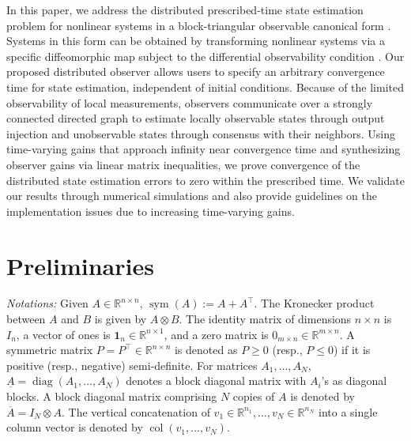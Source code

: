 \documentclass[journal]{IEEEtran}
\newcommand{\diag}{\operatorname{diag}}	%
\newcommand{\sym}{\operatorname{sym}}
\newcommand{\col}{\operatorname{col}}
\def\T{\top}
\begin{document}
In this paper, we address the distributed prescribed-time state estimation problem for nonlinear systems in a block-triangular observable canonical form \cite{Gauthier2001, Shim2001, Hammouri2010}.
Systems in this form can be obtained by transforming nonlinear systems via a specific diffeomorphic map subject to the differential observability condition \cite{Shim2001, gauthier1992}.
Our proposed distributed observer allows users to specify an arbitrary convergence time for state estimation, independent of initial conditions. Because of the limited observability of local measurements, observers communicate over a strongly connected directed graph to estimate locally observable states through output injection and unobservable states through consensus with their neighbors. Using time-varying gains that approach infinity near convergence time and synthesizing observer gains via linear matrix inequalities, we prove convergence of the distributed state estimation errors to zero within the prescribed time. We validate our results through numerical simulations and also provide guidelines on the implementation issues due to increasing time-varying gains.



\section{Preliminaries}
\label{sec:prelim}
\textit{Notations:}
Given $A\in\mathbb{R}^{n\times n}$, $\sym(A):= A+A^\T$. The Kronecker product between $A$ and $B$ is given by $A\otimes B$. The identity matrix of dimensions $n\times n$ is $I_n$, a vector of ones is $\mathbf{1}_n\in\mathbb R^{n\times 1}$, and a zero matrix is $0_{m\times n}\in\mathbb R^{m\times n}$. A symmetric matrix $P=P^\T\in\mathbb R^{n\times n}$ is denoted as $P\geq 0$ (resp., $P\leq 0$) if it is positive (resp., negative) semi-definite.
For matrices $A_1,\dots,A_N$, $\underline A = \diag(A_1,\ldots,A_N)$ denotes a block diagonal matrix with $A_i$'s as diagonal blocks.
A block diagonal matrix comprising $N$ copies of $A$ is denoted by $\overline A = I_N\otimes A$. 
The vertical concatenation of $v_1\in\mathbb R^{n_1},\ldots,v_N\in\mathbb R^{n_N}$ into a single column vector is denoted by $\col(v_1,\dots,v_N)$.

\end{document}
